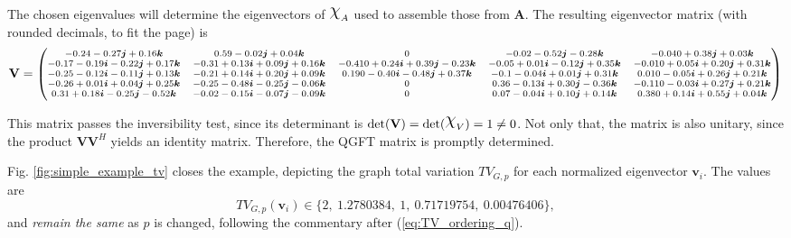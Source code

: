 \begin{landscape}
    The chosen eigenvalues will determine the eigenvectors of $\rchi_A$ used to assemble those from $\mathbf{A}$. The resulting eigenvector matrix (with rounded decimals, to fit the page) is
    \begin{equation*}
        \scriptsize
        \mathbf{V} = \left(\begin{matrix}
                -0.24  -0.27\boldsymbol{j} +0.16\boldsymbol{k}         & 0.59  -0.02\boldsymbol{j} +0.04\boldsymbol{k}          & 0                                 & -0.02  -0.52\boldsymbol{j} -0.28\boldsymbol{k}         & -0.040  +0.38\boldsymbol{j} +0.03\boldsymbol{k}         \\
                -0.17 -0.19\boldsymbol{i} -0.22\boldsymbol{j} +0.17\boldsymbol{k} & -0.31 +0.13\boldsymbol{i} +0.09\boldsymbol{j} +0.16\boldsymbol{k} & -0.410 +0.24\boldsymbol{i} +0.39\boldsymbol{j} -0.23\boldsymbol{k} & -0.05 +0.01\boldsymbol{i} -0.12\boldsymbol{j} +0.35\boldsymbol{k} & -0.010 +0.05\boldsymbol{i} +0.20\boldsymbol{j} +0.31\boldsymbol{k} \\
                -0.25 -0.12\boldsymbol{i} -0.11\boldsymbol{j} +0.13\boldsymbol{k} & -0.21 +0.14\boldsymbol{i} +0.20\boldsymbol{j} +0.09\boldsymbol{k} & 0.190 -0.40\boldsymbol{i} -0.48\boldsymbol{j} +0.37\boldsymbol{k}  & -0.1 -0.04\boldsymbol{i} +0.01\boldsymbol{j} +0.31\boldsymbol{k}  & 0.010 -0.05\boldsymbol{i} +0.26\boldsymbol{j} +0.21\boldsymbol{k}  \\
                -0.26 +0.01\boldsymbol{i} +0.04\boldsymbol{j} +0.25\boldsymbol{k} & -0.25 -0.48\boldsymbol{i} -0.25\boldsymbol{j} -0.06\boldsymbol{k} & 0                                 & 0.36 -0.13\boldsymbol{i} +0.30\boldsymbol{j} -0.36\boldsymbol{k}  & -0.110 -0.03\boldsymbol{i} +0.27\boldsymbol{j} +0.21\boldsymbol{k} \\
                0.31 +0.18\boldsymbol{i} -0.25\boldsymbol{j} -0.52\boldsymbol{k}  & -0.02 -0.15\boldsymbol{i} -0.07\boldsymbol{j} -0.09\boldsymbol{k} & 0                                 & 0.07 -0.04\boldsymbol{i} +0.10\boldsymbol{j} +0.14\boldsymbol{k}  & 0.380 +0.14\boldsymbol{i} +0.55\boldsymbol{j} +0.04\boldsymbol{k}  \\
            \end{matrix}\right)
    \end{equation*}

    This matrix passes the inversibility test, since its determinant is $\mathrm{det}(\mathbf{V}) = \mathrm{det}(\rchi_V) = 1 \neq 0$. Not only that, the matrix is also unitary, since the product $\mathbf{V} \mathbf{V}^H$ yields an identity matrix. Therefore, the QGFT matrix is promptly determined.

    Fig. \ref{fig:simple_example_tv} closes the example, depicting the graph total variation $TV_{G, p}$ for each normalized eigenvector $\mathbf{v}_i$. The values are
    \begin{equation}
        TV_{G, p}(\mathbf{v}_i) \in
        \{2, \ 1.2780384,  \ 1,  \ 0.71719754,  \ 0.00476406\},
    \end{equation}
    and \textit{remain the same} as $p$ is changed, following the commentary after (\ref{eq:TV_ordering_q}).
\end{landscape}

